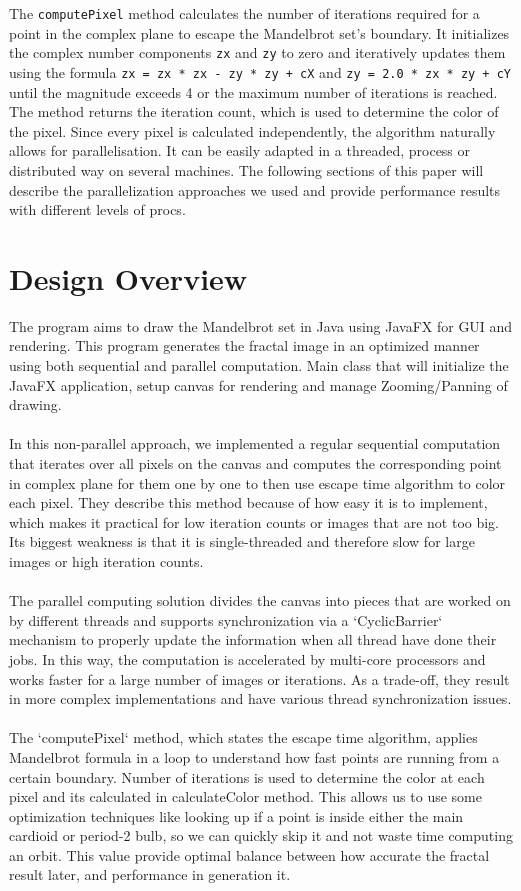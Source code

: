 \documentclass[sigconf]{acmart}
\begin{document}
The \texttt{computePixel} method calculates the number of iterations required for a point in the complex plane to escape the Mandelbrot set's boundary. It initializes the complex number components \texttt{zx} and \texttt{zy} to zero and iteratively updates them using the formula \texttt{zx = zx * zx - zy * zy + cX} and \texttt{zy = 2.0 * zx * zy + cY} until the magnitude exceeds 4 or the maximum number of iterations is reached. The method returns the iteration count, which is used to determine the color of the pixel.
Since every pixel is calculated independently, the algorithm naturally allows for parallelisation. It can be easily adapted in a threaded, process or distributed way on several machines. The following sections of this paper will describe the parallelization approaches we used and provide performance results with different levels of procs.


\section{Design Overview}
The program aims to draw the Mandelbrot set in Java using JavaFX for GUI and rendering. This program generates the fractal image in an optimized manner using both sequential and parallel computation. Main class that will initialize the JavaFX application, setup canvas for rendering and manage Zooming/Panning of drawing.
\\\\
In this non-parallel approach, we implemented a regular sequential computation that iterates over all pixels on the canvas and computes the corresponding point in complex plane for them one by one to then use escape time algorithm to color each pixel. They describe this method because of how easy it is to implement, which makes it practical for low iteration counts or images that are not too big. Its biggest weakness is that it is single-threaded and therefore slow for large images or high iteration counts.
\\\\
The parallel computing solution divides the canvas into pieces that are worked on by different threads and supports synchronization via a `CyclicBarrier` mechanism to properly update the information when all thread have done their jobs. In this way, the computation is accelerated by multi-core processors and works faster for a large number of images or iterations. As a trade-off, they result in more complex implementations and have various thread synchronization issues.
\\\\
The `computePixel` method, which states the escape time algorithm, applies Mandelbrot formula in a loop to understand how fast points are running from a certain boundary. Number of iterations is used to determine the color at each pixel and its calculated in calculateColor method. This allows us to use some optimization techniques like looking up if a point is inside either the main cardioid or period-2 bulb, so we can quickly skip it and not waste time computing an orbit. This value provide optimal balance between how accurate the fractal result later, and performance in generation it.
\end{document}
